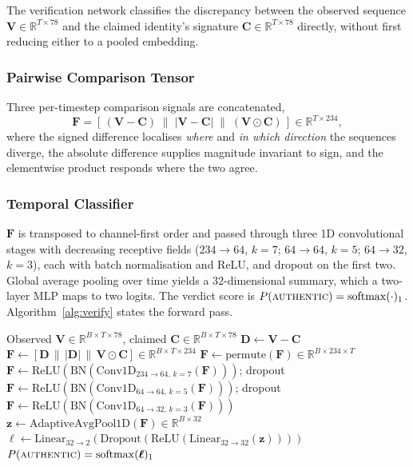 \documentclass[journal]{IEEEtran}
\begin{document}
The verification network classifies the discrepancy between the observed
sequence $\mathbf{V} \in \mathbb{R}^{T \times 78}$ and the claimed identity's
signature $\mathbf{C} \in \mathbb{R}^{T \times 78}$ directly, without first
reducing either to a pooled embedding.

\subsubsection{Pairwise Comparison Tensor}
Three per-timestep comparison signals are concatenated,
\begin{equation}
\mathbf{F} = \left[\, (\mathbf{V}-\mathbf{C}) \;\|\;
|\mathbf{V}-\mathbf{C}| \;\|\;
(\mathbf{V} \odot \mathbf{C}) \,\right] \in \mathbb{R}^{T \times 234},
\end{equation}
where the signed difference localises \emph{where} and \emph{in which
direction} the sequences diverge, the absolute difference supplies magnitude
invariant to sign, and the elementwise product responds where the two agree.

\subsubsection{Temporal Classifier}
$\mathbf{F}$ is transposed to channel-first order and passed through three 1D
convolutional stages with decreasing receptive fields
($234 \rightarrow 64$, $k=7$; $64 \rightarrow 64$, $k=5$;
$64 \rightarrow 32$, $k=3$), each with batch normalisation and ReLU, and
dropout on the first two. Global average pooling over time yields a
32-dimensional summary, which a two-layer MLP maps to two logits. The verdict
score is $P(\textsc{authentic}) = \mathrm{softmax}(\cdot)_1$.
Algorithm~\ref{alg:verify} states the forward pass.

\begin{algorithm}[!t]
\caption{Difference-Based Verification Forward Pass}
\label{alg:verify}
\begin{algorithmic}[1]
\REQUIRE Observed $\mathbf{V} \in \mathbb{R}^{B\times T\times 78}$,
         claimed $\mathbf{C} \in \mathbb{R}^{B\times T\times 78}$
\STATE $\mathbf{D} \leftarrow \mathbf{V} - \mathbf{C}$
\STATE $\mathbf{F} \leftarrow [\mathbf{D} \,\|\, |\mathbf{D}| \,\|\,
        \mathbf{V}\odot\mathbf{C}] \in \mathbb{R}^{B\times T\times 234}$
\STATE $\mathbf{F} \leftarrow \mathrm{permute}(\mathbf{F})
        \in \mathbb{R}^{B\times 234\times T}$
\STATE $\mathbf{F} \leftarrow \mathrm{ReLU}(\mathrm{BN}(
        \mathrm{Conv1D}_{234\rightarrow 64,\,k=7}(\mathbf{F})))$; dropout
\STATE $\mathbf{F} \leftarrow \mathrm{ReLU}(\mathrm{BN}(
        \mathrm{Conv1D}_{64\rightarrow 64,\,k=5}(\mathbf{F})))$; dropout
\STATE $\mathbf{F} \leftarrow \mathrm{ReLU}(\mathrm{BN}(
        \mathrm{Conv1D}_{64\rightarrow 32,\,k=3}(\mathbf{F})))$
\STATE $\mathbf{z} \leftarrow \mathrm{AdaptiveAvgPool1D}(\mathbf{F})
        \in \mathbb{R}^{B\times 32}$
\STATE $\boldsymbol{\ell} \leftarrow
        \mathrm{Linear}_{32\rightarrow 2}(\mathrm{Dropout}(\mathrm{ReLU}(
        \mathrm{Linear}_{32\rightarrow 32}(\mathbf{z}))))$
\RETURN $P(\textsc{authentic}) = \mathrm{softmax}(\boldsymbol{\ell})_1$
\end{algorithmic}
\end{algorithm}
\end{document}
